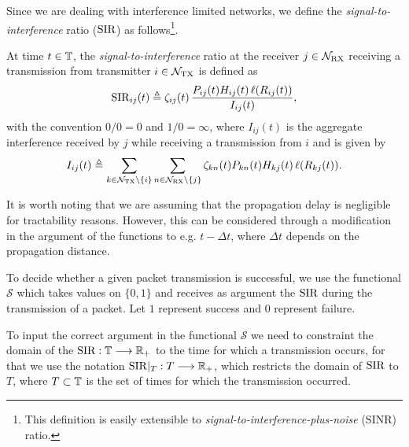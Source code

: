 Since we are dealing with interference limited networks, we define the \textit{signal-to-interference} ratio ($\SIR$) as follows\footnote{This definition is easily extensible to \textit{signal-to-interference-plus-noise} ($\mathrm{SINR}$) ratio.}.

\begin{definition}[\bm{$\SIR$}] \label{eq:SIR}
    At time $t\in{\mathbb T}$, the \textit{signal-to-interference} ratio at the receiver $j\in\mathcal{N}_{\mathrm{RX}}$ receiving a transmission from transmitter $i\in\mathcal{N}_{\mathrm{TX}}$ is defined as
    \begin{align*}
        \mathrm{SIR}_{ij}(t) \triangleq \zeta_{ij}(t)\,\frac{P_{ij}(t) H_{ij}(t)\, \ell(R_{ij}(t))}{I_{ij}(t)},
    \end{align*}
    with the convention $0/0 = 0$ and $1/0 = \infty$,
    where $I_{ij}(t)$ is the aggregate interference received by $j$ while receiving a transmission from $i$ and is given by
    \begin{align*}
        I_{ij}(t) \triangleq \sum_{k\in\mathcal{N_{\mathrm{TX}}}\backslash\{i\}} \sum_{n\in\mathcal{N_{\mathrm{RX}}}\backslash\{j\}} \zeta_{kn}(t) P_{kn}(t) H_{kj}(t) \, \ell(R_{kj}(t)).
    \end{align*}
\end{definition}

It is worth noting that we are assuming that the propagation delay is negligible for tractability reasons.
%
However, this can be considered through a modification in the argument of the functions to e.g. $t-\Delta t$, where $\Delta t$ depends on the propagation distance.

To decide whether a given packet transmission is successful, we use the functional $\mathscr{S}$ which takes values on $\{0,1\}$ and receives as argument the $\SIR$ during the transmission of a packet.
%
Let $1$ represent success and $0$ represent failure.

\begin{remark}
    To input the correct argument in the functional $\mathscr{S}$ we need to constraint the domain of the $\mathrm{SIR}:{\mathbb T}\longrightarrow{\mathbb R}_+$ to the time for which a transmission occurs, for that we use the notation $\mathrm{SIR}\vert_T:T\longrightarrow{\mathbb R}_+$, which restricts the domain of $\SIR$ to $T$, where $T\subset{\mathbb T}$ is the set of times for which the transmission occurred.
\end{remark}

